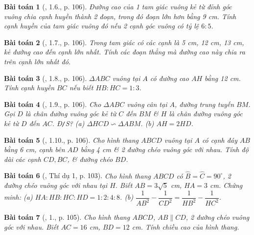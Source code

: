 \documentclass{article}
\newtheorem{baitoan}{Bài toán}
\begin{document}
\begin{baitoan}[\cite{SBT_Toan_9_tap_1}, 1.6., p. 106]
	Đường cao của 1 tam giác vuông kẻ từ đỉnh góc vuông chia cạnh huyền thành 2 đoạn, trong đó đoạn lớn hơn bằng {\rm9 cm}. Tính cạnh huyền của tam giác vuông đó nếu 2 cạnh góc vuông có tỷ lệ $6:5$.
\end{baitoan}

\begin{baitoan}[\cite{SBT_Toan_9_tap_1}, 1.7., p. 106]
	Trong tam giác có các cạnh là {\rm5 cm, 12 cm, 13 cm}, kẻ đường cao đến cạnh lớn nhất. Tính các đoạn thẳng mà đường cao này chia ra trên cạnh lớn nhất đó.
\end{baitoan}

\begin{baitoan}[\cite{SBT_Toan_9_tap_1}, 1.8., p. 106]
	$\Delta ABC$ vuông tại $A$ có đường cao $AH$ bằng {\rm12 cm}. Tính cạnh huyền $BC$ nếu biết $HB:HC = 1:3$.
\end{baitoan}

\begin{baitoan}[\cite{SBT_Toan_9_tap_1}, 1.9., p. 106]
	Cho $\Delta ABC$ vuông cân tại $A$, đường trung tuyến $BM$. Gọi $D$ là chân đường vuông góc kẻ từ $C$ đến $BM$ \& $H$ là chân đường vuông góc kẻ từ $D$ đến $AC$. {\rm Đ\texttt{/}S?} (a) $\Delta HCD\backsim\Delta ABM$. (b) $AH = 2HD$.
\end{baitoan}

\begin{baitoan}[\cite{SBT_Toan_9_tap_1}, 1.10., p. 106]
	Cho hình thang $ABCD$ vuông tại $A$ có cạnh đáy $AB$ bằng {\rm6 cm}, cạnh bên $AD$ bằng {\rm4 cm} \& 2 đường chéo vuông góc với nhau. Tính độ dài các cạnh $CD,BC$, \& đường chéo $BD$.
\end{baitoan}

\begin{baitoan}[\cite{Tuyen_Toan_9}, Thí dụ 1, p. 103]
	Cho hình thang $ABCD$ có $\widehat{B} = \widehat{C} = 90^\circ$, 2 đường chéo vuông góc với nhau tại $H$. Biết $AB = 3\sqrt{5}$ {\rm cm}, $HA = 3$ {\rm cm}. Chứng minh: (a) $HA:HB:HC:HD = 1:2:4:8$. (b) $\dfrac{1}{AB^2} - \dfrac{1}{CD^2} = \dfrac{1}{HB^2} - \dfrac{1}{HC^2}$.
\end{baitoan}

\begin{baitoan}[\cite{Tuyen_Toan_9}, 1., p. 105]
	Cho hình thang $ABCD$, $AB\parallel CD$, 2 đường chéo vuông góc với nhau. Biết $AC = 16$ {\rm cm}, $BD = 12$ {\rm cm}. Tính chiều cao của hình thang.
\end{baitoan}
\end{document}
